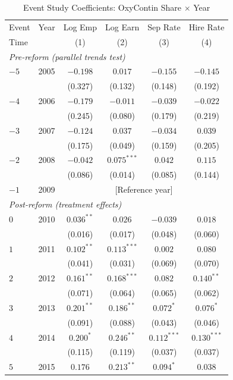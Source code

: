 \begin{table}[t]
\centering
\caption{Event Study Coefficients: OxyContin Share $\times$ Year}
\label{tab:eventstudy}
\begin{threeparttable}
\begin{tabular}{lccccc}
\toprule
Event & Year & Log Emp & Log Earn & Sep Rate & Hire Rate \\
Time & & (1) & (2) & (3) & (4) \\
\midrule
\multicolumn{6}{l}{\textit{Pre-reform (parallel trends test)}} \\
$-5$ & 2005 & $-0.198$ & $0.017$ & $-0.155$ & $-0.145$ \\
 & & (0.327) & (0.132) & (0.148) & (0.192) \\
$-4$ & 2006 & $-0.179$ & $-0.011$ & $-0.039$ & $-0.022$ \\
 & & (0.245) & (0.080) & (0.179) & (0.219) \\
$-3$ & 2007 & $-0.124$ & $0.037$ & $-0.034$ & $0.039$ \\
 & & (0.175) & (0.049) & (0.159) & (0.205) \\
$-2$ & 2008 & $-0.042$ & $0.075^{***}$ & $0.042$ & $0.115$ \\
 & & (0.086) & (0.014) & (0.085) & (0.144) \\
$-1$ & 2009 & \multicolumn{4}{c}{[Reference year]} \\
\midrule
\multicolumn{6}{l}{\textit{Post-reform (treatment effects)}} \\
$0$ & 2010 & $0.036^{**}$ & $0.026$ & $-0.039$ & $0.018$ \\
 & & (0.016) & (0.017) & (0.048) & (0.060) \\
$1$ & 2011 & $0.102^{**}$ & $0.113^{***}$ & $0.002$ & $0.080$ \\
 & & (0.041) & (0.031) & (0.069) & (0.070) \\
$2$ & 2012 & $0.161^{**}$ & $0.168^{***}$ & $0.082$ & $0.140^{**}$ \\
 & & (0.071) & (0.064) & (0.065) & (0.062) \\
$3$ & 2013 & $0.201^{**}$ & $0.186^{**}$ & $0.072^{*}$ & $0.076^{*}$ \\
 & & (0.091) & (0.088) & (0.043) & (0.046) \\
$4$ & 2014 & $0.200^{*}$ & $0.246^{**}$ & $0.112^{***}$ & $0.130^{***}$ \\
 & & (0.115) & (0.119) & (0.037) & (0.037) \\
$5$ & 2015 & $0.176$ & $0.213^{**}$ & $0.094^{*}$ & $0.038$ \\

\end{tabular}
\end{threeparttable}
\end{table}
